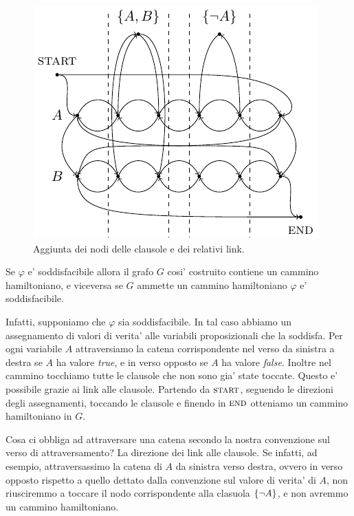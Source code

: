 \begin{figure}[h]
    \begin{center}
        \includegraphics{./img/NPClass/SATdHAM3.pdf}
        \caption{Aggiunta dei nodi delle clausole e dei relativi link.}
    \end{center}
\end{figure}

Se $\varphi$ e' soddisfacibile allora il grafo $G$ cosi' costruito contiene un cammino hamiltoniano,
e viceversa se $G$ ammette un cammino hamiltoniano $\varphi$ e' soddisfacibile.

Infatti, supponiamo che $\varphi$ sia soddisfacibile. In tal caso abbiamo un assegnamento di valori
di verita' alle variabili proposizionali che la soddisfa. Per ogni variabile $A$ attraversiamo la
catena corrispondente nel verso da sinistra a destra se $A$ ha valore \textit{true}, e in verso
opposto se $A$ ha valore \textit{false}. Inoltre nel cammino tocchiamo tutte le clausole che non
sono gia' state toccate.  Questo e' possibile grazie ai link alle clausole. Partendo da
$\textsc{start}$, seguendo le direzioni degli assegnamenti, toccando le clausole e finendo in
$\textsc{end}$ otteniamo un cammino hamiltoniano in $G$.

Cosa ci obbliga ad attraversare una catena secondo la nostra convenzione sul verso di
attraversamento? La direzione dei link alle clausole. Se infatti, ad esempio, attraversassimo la
catena di $A$ da sinistra verso destra, ovvero in verso opposto rispetto a quello dettato dalla
convenzione sul valore di verita' di $A$, non riusciremmo a toccare il nodo corrispondente alla
clasuola $\left\{\lnot A\right\}$, e non avremmo un cammino hamiltoniano.

